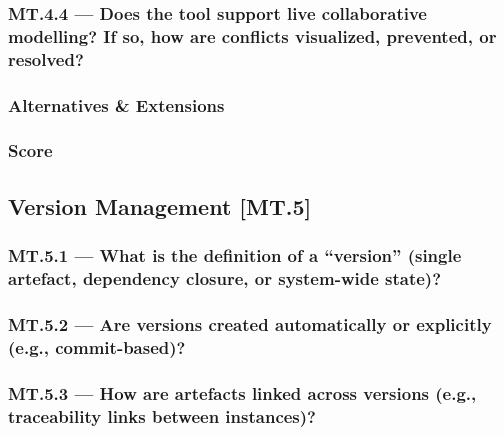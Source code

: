 \documentclass[sigconf]{acmart}
\begin{document}
\subsubsection*{MT.4.4 --- Does the tool support live collaborative modelling? If so, how are conflicts visualized, prevented, or resolved?}
\label{sec:MT4-4}



\subsubsection*{Alternatives \& Extensions}
\label{sec:MT4-Alternatives-Extensions}


\subsubsection*{Score}
\label{sec:MT4-Score}



\subsection{Version Management [MT.5]}
\label{sec:MT5}

\subsubsection*{MT.5.1 --- What is the definition of a ``version'' (single artefact, dependency closure, or system-wide state)?}
\label{sec:MT5-1}



\subsubsection*{MT.5.2 --- Are versions created automatically or explicitly (e.g., commit-based)?}
\label{sec:MT5-2}



\subsubsection*{MT.5.3 --- How are artefacts linked across versions (e.g., traceability links between instances)?}
\label{sec:MT5-3}
\end{document}
